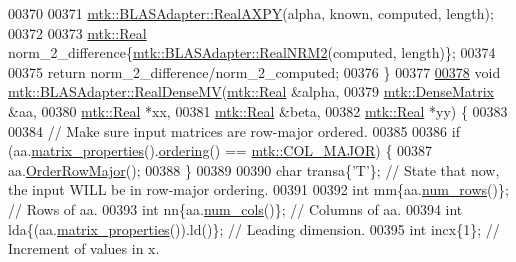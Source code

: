 \begin{DoxyCode}
00370 
00371   \hyperlink{classmtk_1_1BLASAdapter_a081cd092ae65e730f44eae8643edd539}{mtk::BLASAdapter::RealAXPY}(alpha, known, computed, length);
00372 
00373   \hyperlink{group__c01-roots_gac080bbbf5cbb5502c9f00405f894857d}{mtk::Real} norm\_2\_difference\{\hyperlink{classmtk_1_1BLASAdapter_ab92440888b730863244c5d9479c11aca}{mtk::BLASAdapter::RealNRM2}(computed, 
      length)\};
00374 
00375   \textcolor{keywordflow}{return} norm\_2\_difference/norm\_2\_computed;
00376 \}
00377 
\hypertarget{mtk__blas__adapter_8cc_source_l00378}{}\hyperlink{classmtk_1_1BLASAdapter_afdcac059a4294287cb55638221220646}{00378} \textcolor{keywordtype}{void} \hyperlink{classmtk_1_1BLASAdapter_afdcac059a4294287cb55638221220646}{mtk::BLASAdapter::RealDenseMV}(\hyperlink{group__c01-roots_gac080bbbf5cbb5502c9f00405f894857d}{mtk::Real} &alpha,
00379                                    \hyperlink{classmtk_1_1DenseMatrix}{mtk::DenseMatrix} &aa,
00380                                    \hyperlink{group__c01-roots_gac080bbbf5cbb5502c9f00405f894857d}{mtk::Real} *xx,
00381                                    \hyperlink{group__c01-roots_gac080bbbf5cbb5502c9f00405f894857d}{mtk::Real} &beta,
00382                                    \hyperlink{group__c01-roots_gac080bbbf5cbb5502c9f00405f894857d}{mtk::Real} *yy) \{
00383 
00384   \textcolor{comment}{// Make sure input matrices are row-major ordered.}
00385 
00386   \textcolor{keywordflow}{if} (aa.\hyperlink{classmtk_1_1DenseMatrix_abb5e4db5688743c6f9fd9ec6e38ed4ca}{matrix\_properties}().\hyperlink{classmtk_1_1Matrix_af675e480c7b94f194aadad316e53b002}{ordering}() == 
      \hyperlink{namespacemtk_ga622801bd9f912d0f976c3e383f5f581ca7c11989c132253fb76b8f6b1314f7e13}{mtk::COL\_MAJOR}) \{
00387     aa.\hyperlink{classmtk_1_1DenseMatrix_ac2949efba3e8278335d45418c85433e4}{OrderRowMajor}();
00388   \}
00389 
00390   \textcolor{keywordtype}{char} transa\{\textcolor{charliteral}{'T'}\}; \textcolor{comment}{// State that now, the input WILL be in row-major ordering.}
00391 
00392   \textcolor{keywordtype}{int} mm\{aa.\hyperlink{classmtk_1_1DenseMatrix_a17d8d3b9cc0926044b6972dd190a5c21}{num\_rows}()\};                  \textcolor{comment}{// Rows of aa.}
00393   \textcolor{keywordtype}{int} nn\{aa.\hyperlink{classmtk_1_1DenseMatrix_af6f78373aaf2136f0c78974d7c8de0a8}{num\_cols}()\};                  \textcolor{comment}{// Columns of aa.}
00394   \textcolor{keywordtype}{int} lda\{(aa.\hyperlink{classmtk_1_1DenseMatrix_abb5e4db5688743c6f9fd9ec6e38ed4ca}{matrix\_properties}()).ld()\}; \textcolor{comment}{// Leading dimension.}
00395   \textcolor{keywordtype}{int} incx\{1\};                            \textcolor{comment}{// Increment of values in x.}

\end{DoxyCode}
